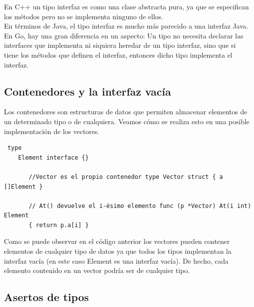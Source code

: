 	En C++ un tipo interfaz es como una clase abstracta pura, ya que se
	especifican los métodos pero no se implementa ninguno de ellos.\\
	
	En términos de Java, el tipo interfaz es mucho más parecido a una interfaz
	Java.\\
	
	En Go, hay una gran diferencia en un aspecto: Un tipo no necesita declarar
	las interfaces que implementa ni siquiera heredar de un tipo interfaz, sino
	que si tiene los métodos que definen el interfaz, entonces dicho tipo
	implementa el interfaz.
	
	
	
	\subsection{Contenedores y la interfaz vacía}
	
	Los contenedores son estructuras de datos que permiten almacenar elementos
	de un determinado tipo o de cualquiera. Veamos cómo se realiza esto en una
	posible implementación de los vectores.  \clearpage \begin{verbatim} type
	Element interface {}
	   
	   //Vector es el propio contenedor type Vector struct { a []Element }
	   
	   // At() devuelve el i-ésimo elemento func (p *Vector) At(i int) Element
	   { return p.a[i] } \end{verbatim}
	
	Como se puede observar en el código anterior los vectores pueden contener
	elementos de cualquier tipo de datos ya que todos los tipos implementan la
	interfaz vacía (en este caso Element es una interfaz vacía). De hecho, cada
	elemento contenido en un vector podría ser de cualquier tipo.
	
	\subsection{Asertos de tipos}
	
